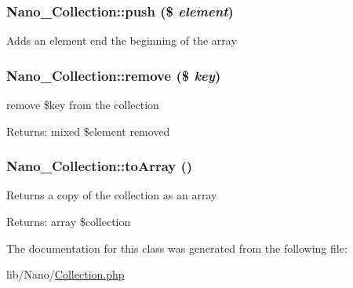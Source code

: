 \hypertarget{classNano__Collection_1d77c642aac8c7d58893379c70bd9cfb}{
\subsubsection[{push}]{\setlength{\rightskip}{0pt plus 5cm}Nano\_\-Collection::push (\$ {\em element})}}
\label{classNano__Collection_1d77c642aac8c7d58893379c70bd9cfb}


Adds an element end the beginning of the array \hypertarget{classNano__Collection_258e46af26d02f5c1a6f7273471bb86c}{
\subsubsection[{remove}]{\setlength{\rightskip}{0pt plus 5cm}Nano\_\-Collection::remove (\$ {\em key})}}
\label{classNano__Collection_258e46af26d02f5c1a6f7273471bb86c}


remove \$key from the collection

\begin{Desc}
\item[Returns:]mixed \$element removed \end{Desc}
\hypertarget{classNano__Collection_f45474db23d4d5b0b122ab233e3cc725}{
\subsubsection[{toArray}]{\setlength{\rightskip}{0pt plus 5cm}Nano\_\-Collection::toArray ()}}
\label{classNano__Collection_f45474db23d4d5b0b122ab233e3cc725}


Returns a copy of the collection as an array \begin{Desc}
\item[Returns:]array \$collection \end{Desc}


The documentation for this class was generated from the following file:\begin{CompactItemize}
\item 
lib/Nano/\hyperlink{Collection_8php}{Collection.php}\end{CompactItemize}
